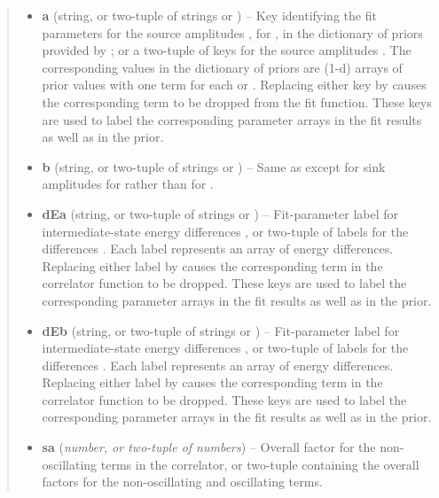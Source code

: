 \documentclass[letterpaper,10pt,english]{sphinxmanual}
\begin{document}
\begin{fulllineitems}
\begin{quote}
\begin{description}
\begin{itemize}
\item {} 
\textbf{a} (string, or two-tuple of strings or ) -- Key identifying the fit parameters for the source amplitudes
, for , in the dictionary of priors provided by
{\hyperref[corrfitter:corrfitter.CorrFitter]{}}; or a two-tuple of keys for the source amplitudes
. The corresponding values in the dictionary of priors
are (1-d) arrays of prior values with one term for each 
or . Replacing either key by  causes the
corresponding term to be dropped from the fit function. These keys
are used to label the corresponding parameter arrays in the fit
results as well as in the prior.

\item {} 
\textbf{b} (string, or two-tuple of strings or ) -- Same as  except for sink amplitudes  
for  rather than for .

\item {} 
\textbf{dEa} (string, or two-tuple of strings or ) -- Fit-parameter label for  intermediate-state energy 
differences , or two-tuple of labels for the differences
. Each label represents an array of energy differences.
Replacing either label by  causes the corresponding term in
the correlator function to be dropped. These keys
are used to label the corresponding parameter arrays in the fit
results as well as in the prior.

\item {} 
\textbf{dEb} (string, or two-tuple of strings or ) -- Fit-parameter label for  intermediate-state energy 
differences , or two-tuple of labels for the differences
. Each label represents an array of energy differences.
Replacing either label by  causes the corresponding term in
the correlator function to be dropped. These keys
are used to label the corresponding parameter arrays in the fit
results as well as in the prior.

\item {} 
\textbf{sa} (\emph{number, or two-tuple of numbers}) -- Overall factor  for the non-oscillating  terms 
in the correlator, or two-tuple containing the overall factors
 for the non-oscillating and oscillating terms.


\end{itemize}
\end{description}
\end{quote}
\end{fulllineitems}
\end{document}
